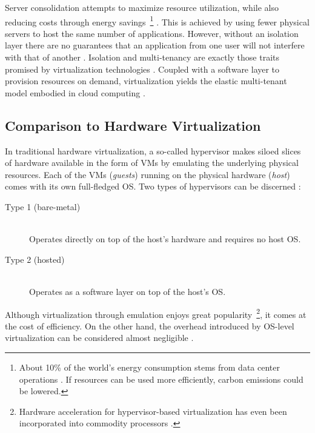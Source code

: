 Server consolidation attempts to maximize resource utilization, while also reducing costs through energy savings~\footnote{About 10\% of the world's energy consumption stems from data center operations \cite[p.~1]{scheepers2014virtualization}. If resources can be used more efficiently, carbon emissions could be lowered.} \cite[p.~233]{xavier2013performance} \cite[p.~2]{eder2016hypervisor}. This is achieved by using fewer physical servers to host the same number of applications. However, without an isolation layer there are no guarantees that an application from one user will not interfere with that of another \cite[p.~233]{xavier2013performance}. Isolation and multi-tenancy are exactly those traits promised by virtualization technologies \cite[p.~21]{da2018containers}. Coupled with a software layer to provision resources on demand, virtualization yields the elastic multi-tenant model embodied in \gls{cloud computing} \cite[p.~203]{kang2016container} \cite[p.~81]{bernstein2014containers} \cite[p.~24]{pahl2015containerization}.


\subsection{Comparison to Hardware Virtualization}
\label{sec:os-hardware-virtualization-comparison}

In traditional hardware virtualization, a so-called hypervisor makes siloed slices of hardware available in the form of \acp{VM} by emulating the underlying physical resources. Each of the \acp{VM} (\textit{guests}) running on the physical hardware (\textit{host}) comes with its own full-fledged \acs{OS}. Two types of hypervisors can be discerned \cite[p.~2]{merkel2014docker} \cite[p.~1]{eder2016hypervisor} \cite[pp.~386--387]{morabito2015hypervisors}:

\begin{description}
  \item[Type 1 (bare-metal)]
  \hfill \\
  Operates directly on top of the host's hardware and requires no host \acs{OS}.

  \item[Type 2 (hosted)]
  \hfill \\
  Operates as a software layer on top of the host's \acs{OS}.
\end{description}

Although virtualization through emulation enjoys great popularity~\footnote{Hardware acceleration for hypervisor-based virtualization has even been incorporated into commodity processors \cite[p.~233]{xavier2013performance}.}, it comes at the cost of efficiency. On the other hand, the overhead introduced by OS-level virtualization can be considered almost negligible \cite[pp.~386,~392]{morabito2015hypervisors}.

